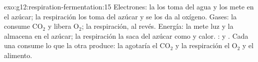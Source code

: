 \begin{solution}{exo:g12:respiration-fermentation:15}
Electrones: la  los toma del agua y los mete en el azúcar;
la respiración los toma del azúcar y se los da al oxígeno. Gases: la
 consume $\mathrm{CO_2}$ y libera $\mathrm{O_2}$; la
respiración, al revés. Energía: la  mete luz y la almacena
en el azúcar; la respiración la saca del azúcar como  y calor.
:  y . Cada una consume lo que la otra
produce: la  agotaría el $\mathrm{CO_2}$ y la respiración
el $\mathrm{O_2}$ y el alimento.
\end{solution}

